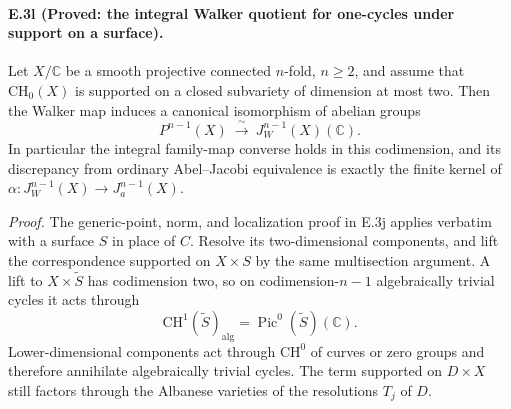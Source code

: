 \paragraph{E.3l (Proved: the integral Walker quotient for one-cycles
under support on a surface).}
Let $X/\mathbb C$ be a smooth projective connected $n$-fold,
$n\ge2$, and assume that $\mathrm{CH}_0(X)$ is supported on
a closed subvariety of dimension at most two. Then the
Walker map induces a canonical isomorphism of abelian groups
\begin{equation}\label{eq:E3-Walker-quotient}
 P^{n-1}(X)\ \xrightarrow{\ \sim\ }\ 
               J_W^{n-1}(X)(\mathbb C).
\end{equation}
In particular the integral family-map converse holds in this
codimension, and its discrepancy from ordinary Abel--Jacobi
equivalence is exactly the finite kernel of
$\alpha:J_W^{n-1}(X)\to J_a^{n-1}(X)$.

\emph{Proof.}
The generic-point, norm, and localization proof in E.3j
applies verbatim with a surface $S$ in place of $C$.
Resolve its two-dimensional components, and lift the
correspondence supported on $X\times S$ by the same
multisection argument. A lift to $X\times\widetilde S$ has
codimension two, so on codimension-$n-1$ algebraically trivial
cycles it acts through
\[
 \mathrm{CH}^1(\widetilde S)_{\mathrm{alg}}
              =\operatorname{Pic}^0(\widetilde S)(\mathbb C).
\]
Lower-dimensional components act through
$\mathrm{CH}^0$ of curves or zero groups and therefore
annihilate algebraically trivial cycles. The term supported
on $D\times X$ still factors through the Albanese varieties
of the resolutions $T_j$ of $D$.

